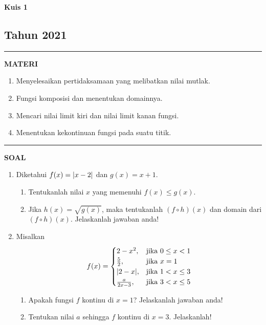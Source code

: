 \begin{flushright}
    \textbf{\Large{Kuis 1}}
    \subsection*{Tahun 2021}
\end{flushright}


\vspace{0.5cm}\hrule height 2pt\vspace{0.5cm}


\begin{center}
\textbf{\large{MATERI}}
\begin{enumerate}[leftmargin=*, label={\arabic*}.]
\item Menyelesaikan pertidaksamaan yang melibatkan nilai mutlak.
\item Fungsi komposisi dan menentukan domainnya.
\item Mencari nilai limit kiri dan nilai limit kanan fungsi.
\item Menentukan kekontinuan fungsi pada suatu titik.
\end{enumerate}
\end{center}


\vspace{0.2cm}\hrule height 1pt\vspace{0.5cm}


\begin{center}
\textbf{\large{SOAL}}
\end{center}
\begin{enumerate}[leftmargin=*, label={\arabic*}.]
\item Diketahui 
$f(x) = \lvert x-2\rvert$ dan 
$g(x) = x+1$.
    \begin{enumerate}[label={\alph*}.]
    \item Tentukanlah nilai $x$ yang memenuhi $f(x) \leq g(x)$.
    \item Jika 
    $h(x) = \sqrt{g(x)}$, maka tentukanlah 
    $(f \circ h)(x)$ dan domain dari
    $(f \circ h)(x)$. Jelaskanlah jawaban anda!
    \end{enumerate}
\item Misalkan
\[
    f(x) = 
    \begin{cases}
        2-x^{2}, &\text{jika $0 \leq x < 1$}\\
        \frac{5}{2}, &\text{jika $x = 1$}\\
        \lvert2-x\rvert, &\text{jika $1 < x \leq 3$}\\
        \frac{a}{2x-3}, &\text{jika $3 < x \leq 5$}
    \end{cases}
\]
    \begin{enumerate}[label={\alph*}.]
    \item Apakah fungsi $f$ kontinu di $x=1$? Jelaskanlah jawaban anda!
    \item Tentukan nilai $a$ sehingga $f$ kontinu di $x=3$. Jelaskanlah!
    \end{enumerate}
\end{enumerate}


